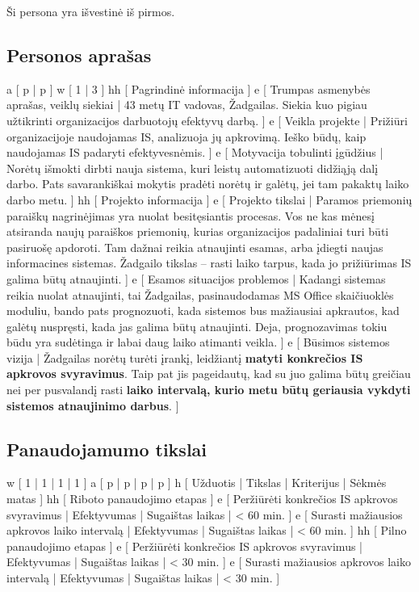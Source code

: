 ﻿Ši persona yra išvestinė iš pirmos.
\subsection{Personos aprašas}
\xtableu
{
  a [ p | p ]
  w [ 1 | 3 ]
  hh [ Pagrindinė informacija ]
  e [ Trumpas asmenybės aprašas, veiklų siekiai 
  | 
    43 metų IT vadovas, Žadgailas. Siekia kuo pigiau užtikrinti
    organizacijos darbuotojų efektyvų darbą.
  ]
  e [ Veikla projekte 
  | 
    Prižiūri organizacijoje naudojamas IS, analizuoja jų apkrovimą.
    Ieško būdų, kaip naudojamas IS padaryti efektyvesnėmis.
  ]
  e [ Motyvacija tobulinti įgūdžius 
  |
    Norėtų išmokti dirbti nauja sistema, kuri leistų automatizuoti
    didžiąją dalį darbo. Pats savarankiškai mokytis pradėti
    norėtų ir galėtų, jei tam pakaktų laiko darbo metu.
  ]
  hh [ Projekto informacija ]
  e [ Projekto tikslai 
  | 
    Paramos priemonių paraiškų nagrinėjimas yra nuolat
    besitęsiantis procesas. Vos ne kas mėnesį atsiranda naujų
    paraiškos priemonių, kurias organizacijos padaliniai turi būti
    pasiruošę apdoroti. Tam dažnai reikia atnaujinti esamas, arba
    įdiegti naujas informacines sistemas. Žadgailo tikslas – rasti
    laiko tarpus, kada jo prižiūrimas IS galima būtų atnaujinti.
  ]
  e [ Esamos situacijos problemos 
  | 
    Kadangi sistemas reikia nuolat atnaujinti, tai Žadgailas,
    pasinaudodamas MS Office skaičiuoklės moduliu, bando pats
    prognozuoti, kada sistemos bus mažiausiai apkrautos, kad galėtų
    nuspręsti, kada jas galima būtų atnaujinti. Deja, prognozavimas
    tokiu būdu yra sudėtinga ir labai daug laiko atimanti veikla.
  ]
  e [ Būsimos sistemos vizija 
  | 
    Žadgailas norėtų turėti įrankį, leidžiantį \textbf{matyti konkrečios
    IS apkrovos svyravimus}. Taip pat jis pageidautų, kad su juo
    galima būtų greičiau nei per pusvalandį rasti \textbf{laiko intervalą,
    kurio metu būtų geriausia vykdyti sistemos atnaujinimo darbus}.
  ]
}

\newpage
\subsection{Panaudojamumo tikslai}
\xtable
{
  w [ 1 | 1 | 1 | 1 ]
  a [ p | p | p | p ]
  h [ Užduotis | Tikslas | Kriterijus | Sėkmės matas ]
  hh [ Riboto panaudojimo etapas ]
  e [ Peržiūrėti konkrečios IS apkrovos svyravimus | Efektyvumas | Sugaištas laikas | < 60 min. ]
  e [ Surasti mažiausios apkrovos laiko intervalą | Efektyvumas | Sugaištas laikas | < 60 min. ]
  hh [ Pilno panaudojimo etapas ]
  e [ Peržiūrėti konkrečios IS apkrovos svyravimus | Efektyvumas | Sugaištas laikas | < 30 min. ]
  e [ Surasti mažiausios apkrovos laiko intervalą | Efektyvumas | Sugaištas laikas | < 30 min. ]
}
